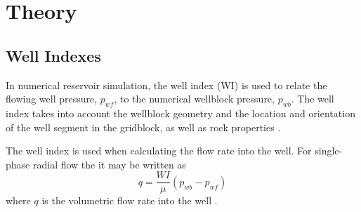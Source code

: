 
\section{Theory} %
\label{sec:theory}

\subsection{Well Indexes} %
\label{sub:well_indices}
In numerical reservoir simulation, the well index (WI) is used to relate the flowing well pressure, $p_{wf}$,  to the numerical wellblock pressure, $p_{wb}$. The well index takes into account the wellblock geometry and the location and orientation of the well segment in the gridblock, as well as rock properties \cite{Peaceman2003New}.

The well index is used when calculating the flow rate into the well. For single-phase radial flow the it may be written as
\begin{equation}
    \label{eq:peaceman-wi1}
    q = \frac{WI}{\mu} \left( p_{wb} - p_{wf} \right)
\end{equation}
where $q$ is the volumetric flow rate into the well \cite{Peaceman2003New}.

